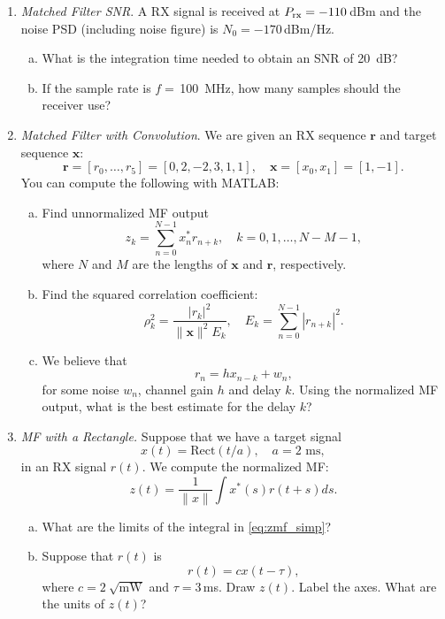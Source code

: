 \documentclass[11pt]{article}
\def\sqrtmw{\sqrt{\mathrm{mW}}}
\newcommand{\rbf}{\boldsymbol{r}}
\newcommand{\xbf}{\boldsymbol{x}}
\begin{document}
\begin{enumerate}
\item \emph{Matched Filter SNR}.  A RX signal is received at $P_{\rm rx}=-110$\,\si{dBm} and the noise PSD 
(including noise figure) is $N_0=-170$\,\si{dBm/Hz}.  
\begin{enumerate}[(a)]
\item What is the integration time needed to obtain an SNR of \SI{20}{dB}?
\item If the sample rate is $f=$\,\SI{100}{MHz}, how many samples should the receiver use?
\end{enumerate}



\item \emph{Matched Filter with Convolution}.  
We are given an RX sequence $\rbf$ and target sequence $\xbf$:
\[
    \rbf = [r_0,\ldots,r_5] = [0,2,-2,3,1,1], \quad \xbf = [x_0,x_1]=[1,-1].
\]
You can compute the following with MATLAB:
\begin{enumerate}[(a)]
\item Find unnormalized MF output
\[
    z_k = \sum_{n=0}^{N-1} x_n^*r_{n+k}, \quad k=0,1,\ldots,N-M-1,
\]
where $N$ and $M$ are the lengths of $\xbf$ and $\rbf$, respectively.
\item Find the squared correlation coefficient:
\[
    \rho_k^2 = \frac{|r_k|^2}{\|\xbf\|^2E_k}, \quad E_k = \sum_{n=0}^{N-1} |r_{n+k}|^2.
\]

\item We believe that
\[
    r_n = hx_{n-k} + w_n,
\]
for some noise $w_n$, channel gain $h$ and delay $k$. 
Using the normalized MF output, what is the best estimate for the delay $k$?
\end{enumerate}

\item \label{prob:mf_rect} \emph{MF with a Rectangle.}
Suppose that we have a target signal
\[
    x(t) = \mathrm{Rect}(t/a), \quad a = 2\mbox{ ms},
\]
in an RX signal $r(t)$.  We compute the normalized MF:
\begin{equation} \label{eq:zmf_simp}
    z(t) = \frac{1}{\|x\|} \int x^*(s)r(t+s)ds.
\end{equation}
\begin{enumerate}[(a)]
\item What are the limits of the integral  in \eqref{eq:zmf_simp}?
\item Suppose that $r(t)$ is
\[
    r(t) = c x(t-\tau),
\]
where $c = 2~\sqrtmw$ and $\tau=3$\,\si{ms}.  Draw $z(t)$.  Label the axes.
What are the units of $z(t)$?

\end{enumerate}



\end{enumerate}
\end{document}
